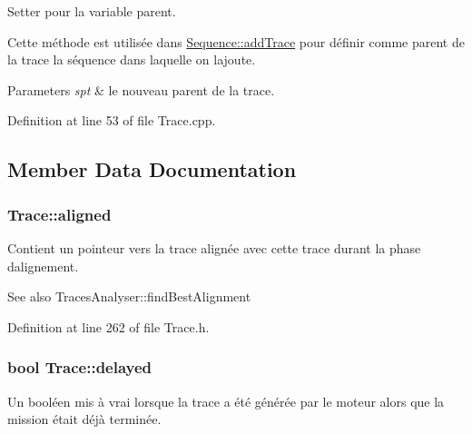 Setter pour la variable {\ttfamily parent}. 

Cette méthode est utilisée dans \hyperlink{class_sequence_a74e000d0651eb8d4c7bfd20032440c07}{Sequence\+::add\+Trace} pour définir comme parent de la trace la séquence dans laquelle on l\textquotesingle{}ajoute.


\begin{DoxyParams}{Parameters}
{\em spt} & le nouveau {\ttfamily parent} de la trace. \\
\hline
\end{DoxyParams}


Definition at line 53 of file Trace.\+cpp.



\subsection{Member Data Documentation}
\subsubsection[{\texorpdfstring{aligned}{aligned}}]{ Trace\+::aligned\hspace{0.3cm}{\ttfamily [protected]}}\hypertarget{class_trace_a4ace0a20ceb2b0722970be729bd41dc8}{}\label{class_trace_a4ace0a20ceb2b0722970be729bd41dc8}
Contient un pointeur vers la trace alignée avec cette trace durant la phase d\textquotesingle{}alignement.

\begin{DoxySeeAlso}{See also}
Traces\+Analyser\+::find\+Best\+Alignment 
\end{DoxySeeAlso}


Definition at line 262 of file Trace.\+h.

\subsubsection[{\texorpdfstring{delayed}{delayed}}]{\setlength{\rightskip}{0pt plus 5cm}bool Trace\+::delayed\hspace{0.3cm}{\ttfamily [protected]}}\hypertarget{class_trace_a9757057cc65f9e45bbeaa848cb06d5a1}{}\label{class_trace_a9757057cc65f9e45bbeaa848cb06d5a1}
Un booléen mis à vrai lorsque la trace a été générée par le moteur alors que la mission était déjà terminée. 

